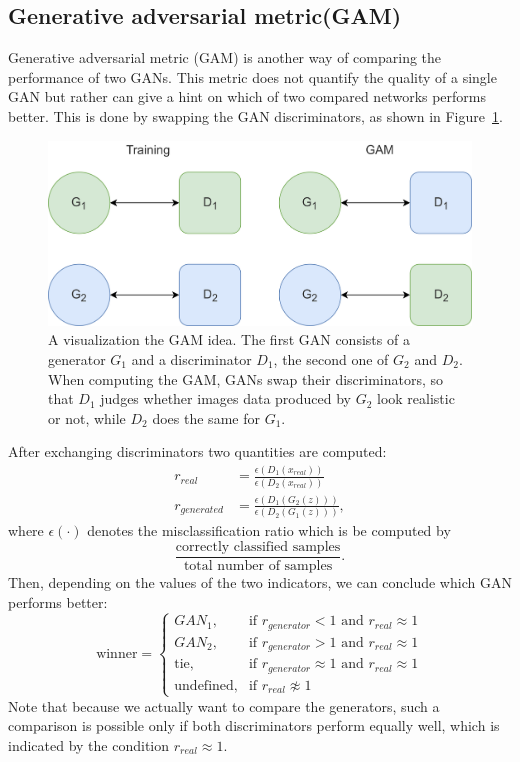 \subsection{Generative adversarial metric(GAM)} \label{sec:gam}
Generative adversarial metric (GAM) is another way of comparing the performance of two GANs. This metric does not quantify the quality of a single GAN but rather can give a hint on which of two compared networks performs better. This is done by swapping the GAN discriminators, as shown in Figure~\ref{fig:gam}. 
\begin{figure}[h]
	\includegraphics[width=\textwidth]{figures/gam}
	\caption{A visualization the GAM idea. The first GAN consists of a generator $G_1$ and a discriminator $D_1$, the second one of $G_2$ and $D_2$. When computing the GAM, GANs swap their discriminators, so that $D_1$ judges whether images data produced by $G_2$ look realistic or not, while $D_2$ does the same for $G_1$.}
	\label{fig:gam}
\end{figure}
 
After exchanging discriminators two quantities are computed:
\begin{align} \label{eq:gam_real}
	r_{real} &= \frac{\epsilon(D_1(x_{real}))}{\epsilon(D_2(x_{real}))} \\ 
	r_{generated} &= \frac{\epsilon(D_1(G_2(z)))}{\epsilon(D_2(G_1(z)))}, \label{eq:gam_gen} 
 \end{align}
where $\epsilon(\cdot)$ denotes the misclassification ratio which is be computed by 
\begin{equation*}
	\frac{\text{correctly classified samples}}{\text{total number of samples}}.
\end{equation*} 
Then, depending on the values of the two indicators, we can conclude which GAN performs better:
\begin{equation}
\text{winner} = \begin{cases}
	GAN_1, & \text{if } r_{generator} < 1 \text{ and } r_{real} \approx 1 \\
	GAN_2, & \text{if } r_{generator} > 1 \text{ and } r_{real} \approx 1 \\
	\text{tie}, & \text{if } r_{generator} \approx 1 \text{ and } r_{real} \approx 1  \\
	\text{undefined}, & \text{if } r_{real} \not \approx 1	
	\end{cases}
\end{equation}
Note that because we actually want to compare the generators, such a comparison is possible only if both discriminators perform equally well, which is indicated by the condition $r_{real} \approx 1$.  
